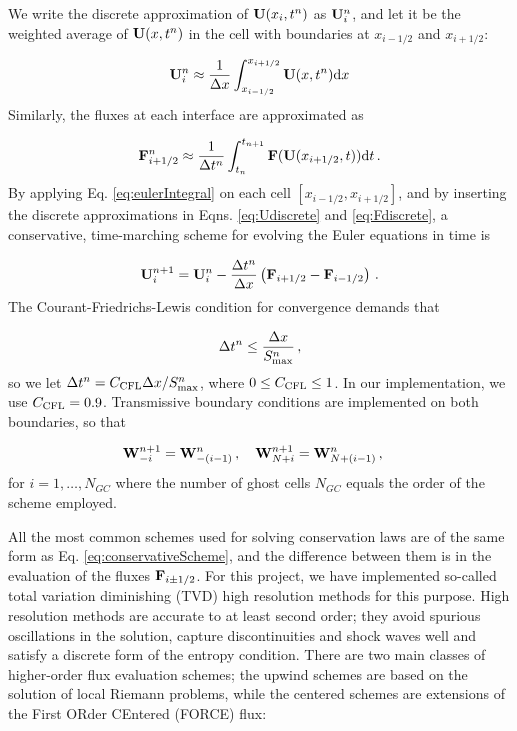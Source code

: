 \documentclass[final,3p,twocolumn,times]{elsarticle}
\begin{document}
We write the discrete
approximation of ${\bf U}(x_i, t^n)$ as ${\bf U}_i^n$, and let it be the
weighted average of ${\bf U}(x,t^n)$ in the cell with boundaries at
$x_{i-1/2}$ and $x_{i+1/2}$: 

\begin{equation}
    {\bf U}_i^n \approx \frac{1}{\Delta x} \int_{x_{i-1/2}}^{x_{i+1/2}} {\bf
    U}(x,t^n) {\rm d}x 
    \label{eq:Udiscrete}
\end{equation}
%
Similarly, the fluxes at each interface are approximated as 

\begin{equation}
    {\bf F}_{i+1/2}^n \approx \frac{1}{\Delta t^n} 
    \int_{t_{n}}^{t_{n+1}} {\bf F}({\bf U}(x_{i+1/2},t)) {\rm d}t \,. 
    \label{eq:Fdiscrete}
\end{equation}
%
By applying Eq. \eqref{eq:eulerIntegral} on each cell $[x_{i-1/2},x_{i+1/2}]$,
and by inserting the discrete approximations in Eqns. \eqref{eq:Udiscrete} and
\eqref{eq:Fdiscrete}, a conservative, time-marching scheme for evolving the
Euler equations in time is 

\begin{equation}
    {\bf U}_i^{n+1} = {\bf U}_i^n - \frac{\Delta t^n}{\Delta x} \left(
    {\bf F}_{i+1/2} - {\bf F}_{i-1/2} \right) \,. 
    \label{eq:conservativeScheme}
\end{equation}
%
The Courant-Friedrichs-Lewis condition for convergence demands that 

\begin{equation}
    \Delta t^n \leq \frac{\Delta x}{S_{\rm max}^n} \,,
\end{equation}
%
so we let $\Delta t^n = C_{\rm CFL} \Delta x / S_{\rm max}^n$, where $0 \leq
C_{\rm CFL} \leq 1$. In our implementation, we use $C_{\rm CFL}=0.9$.
Transmissive boundary conditions are implemented on both boundaries, so that

\begin{equation}
    \label{eq:BCs} 
    {\bf W}_{-i}^{n+1} = {\bf W}_{-(i-1)}^{n} \,, \quad
    {\bf W}_{N+i}^{n+1} = {\bf W}_{N+(i-1)}^{n} \,, \quad 
\end{equation}
%
for $i=1, \dots, N_{GC}$ where the number of ghost cells $N_{GC}$ equals the
order of the scheme employed. 

All the most common schemes used for solving conservation laws are of the same
form as Eq. \eqref{eq:conservativeScheme}, and the difference between them is
in the evaluation of the fluxes ${\bf F}_{i\pm 1/2}$. For this project, we have
implemented so-called total variation diminishing (TVD) high resolution methods
for this purpose. High resolution methods are accurate to at least second
order; they avoid spurious oscillations in the solution, capture
discontinuities and shock waves well and satisfy a discrete form of the entropy
condition. There are two main classes of higher-order flux evaluation schemes;
the upwind schemes are based on the solution of local Riemann problems, while
the centered schemes are extensions of the First ORder CEntered (FORCE) flux: 
\end{document}
